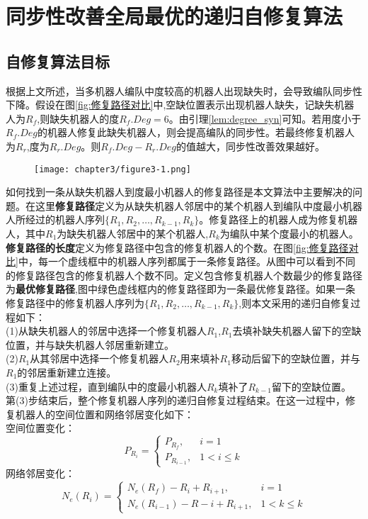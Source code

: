 
\chapter{同步性改善全局最优的递归自修复算法}

\section{自修复算法目标}
根据上文所述，当多机器人编队中度较高的机器人出现缺失时，会导致编队同步性下降。假设在图\ref{fig:修复路径对比}中,空缺位置表示出现机器人缺失，记缺失机器人为$R_f$,则缺失机器人的度${R_f}.Deg = 6$。由引理\ref{lem:degree_syn}可知。若用度小于$R_f.Deg$的机器人修复此缺失机器人，则会提高编队的同步性。若最终修复机器人为$R_r$,度为$R_r.Deg$。则$R_f.Deg-R_r.Deg$的值越大，同步性改善效果越好。
\begin{figure}[!htbp]
	\centering
	\texttt{[image: chapter3/figure3-1.png]}
\end{figure}

如何找到一条从缺失机器人到度最小机器人的修复路径是本文算法中主要解决的问题。在这里\textbf{修复路径}定义为从缺失机器人邻居中的某个机器人到编队中度最小机器人所经过的机器人序列$\{R_1,R_2,\dots,R_{k-1},R_k\}$。修复路径上的机器人成为修复机器人，其中$R_1$为缺失机器人邻居中的某个机器人,$R_k$为编队中某个度最小的机器人。\textbf{修复路径的长度}定义为修复路径中包含的修复机器人的个数。在图\ref{fig:修复路径对比}中，每一个虚线框中的机器人序列都属于一条修复路径。从图中可以看到不同的修复路径包含的修复机器人个数不同。定义包含修复机器人个数最少的修复路径为\textbf{最优修复路径},图中绿色虚线框内的修复路径即为一条最优修复路径。如果一条修复路径中的修复机器人序列为$\{R_1,R_2,\dots,R_{k-1},R_k\}$,则本文采用的递归自修复过程如下：\\
\indent (1)从缺失机器人的邻居中选择一个修复机器人$R_1$,$R_1$去填补缺失机器人留下的空缺位置，并与缺失机器人邻居重新建立。\\
\indent (2)$R_1$从其邻居中选择一个修复机器人$R_2$用来填补$R_1$移动后留下的空缺位置，并与$R_1$的邻居重新建立连接。\\
\indent (3)重复上述过程，直到编队中的度最小机器人$R_k$填补了$R_{k-1}$留下的空缺位置。\\
第(3)步结束后，整个修复机器人序列的递归自修复过程结束。在这一过程中，修复机器人的空间位置和网络邻居变化如下：\\
空间位置变化：
\begin{equation}
	P_{R_i} = 
	\begin{cases}
		P_{R_f}, & i=1 \\
		P_{R_{i-1}}, & 1 < i \leq k
	\end{cases}
\end{equation}
网络邻居变化：\\
\begin{equation}
	N_e(R_i) = 
	\begin{cases}
		N_e(R_f) - R_i + R_{i+1}, & i = 1 \\
		N_e(R_{i-1}) - R-i + R_{i+1}, & 1<k \leq k
	\end{cases}
\end{equation}

